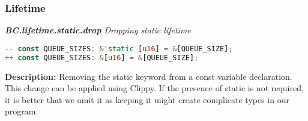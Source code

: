 \subsubsection{Lifetime}
\noindent\textit{\textbf{BC.lifetime.static.drop} Dropping static lifetime}

\begin{lstlisting}[language=Rust, style=colouredRust]
-- const QUEUE_SIZES: &'static [u16] = &[QUEUE_SIZE];
++ const QUEUE_SIZES: &[u16] = &[QUEUE_SIZE];

\end{lstlisting}

\noindent\textbf{Description:} Removing the static keyword from a const variable declaration. This change can be applied using Clippy. If the presence of static is not required, it is better that we omit it as keeping it might create complicate types in our program.

